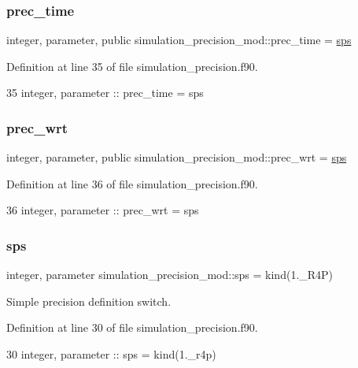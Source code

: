 \subsubsection{\texorpdfstring{prec\+\_\+time}{prec\_time}}
{\footnotesize\ttfamily integer, parameter, public simulation\+\_\+precision\+\_\+mod\+::prec\+\_\+time = \mbox{\hyperlink{namespacesimulation__precision__mod_aa9eb32e6c7ef6d6f0b9c7df435105e88}{sps}}}



Definition at line 35 of file simulation\+\_\+precision.\+f90.


\begin{DoxyCode}
35     \textcolor{keywordtype}{integer},  \textcolor{keywordtype}{parameter} :: prec\_time = sps
\end{DoxyCode}
\mbox{\label{namespacesimulation__precision__mod_ad515822198607dfee68a6ed8b246c7da}} 
\subsubsection{\texorpdfstring{prec\+\_\+wrt}{prec\_wrt}}
{\footnotesize\ttfamily integer, parameter, public simulation\+\_\+precision\+\_\+mod\+::prec\+\_\+wrt = \mbox{\hyperlink{namespacesimulation__precision__mod_aa9eb32e6c7ef6d6f0b9c7df435105e88}{sps}}}



Definition at line 36 of file simulation\+\_\+precision.\+f90.


\begin{DoxyCode}
36     \textcolor{keywordtype}{integer},  \textcolor{keywordtype}{parameter} :: prec\_wrt  = sps
\end{DoxyCode}
\mbox{\label{namespacesimulation__precision__mod_aa9eb32e6c7ef6d6f0b9c7df435105e88}} 
\subsubsection{\texorpdfstring{sps}{sps}}
{\footnotesize\ttfamily integer, parameter simulation\+\_\+precision\+\_\+mod\+::sps = kind(1.\+\_\+\+R4P)\hspace{0.3cm}{\ttfamily [private]}}



Simple precision definition switch. 



Definition at line 30 of file simulation\+\_\+precision.\+f90.


\begin{DoxyCode}
30     \textcolor{keywordtype}{integer},  \textcolor{keywordtype}{parameter} :: sps  = kind(1.\_r4p)   
\end{DoxyCode}

